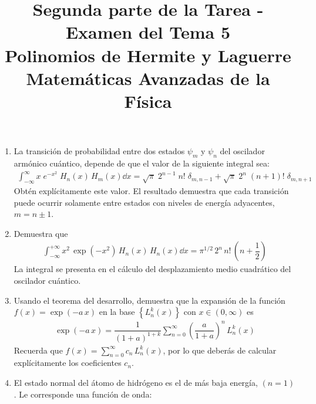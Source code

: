 
\author{}
\title{Segunda parte de la Tarea - Examen del Tema 5  \\ \large{Polinomios de Hermite y Laguerre \\ Matemáticas Avanzadas de la Física}} \vspace{-1.5\baselineskip}
\date{ }

\vspace{-4cm}
\renewcommand\labelenumii{\theenumi.{\arabic{enumii})}}
\maketitle
\fontsize{14}{14}\selectfont
\begin{enumerate}
\item La transición de probabilidad entre dos estados $\psi_{m}$ y $\psi_{n}$ del oscilador armónico cuántico, depende de que el valor de la siguiente integral sea:
\begin{align*}
\int_{-\infty}^{\infty} x \; e^{-x^{2}} \; H_{n} (x) \, H_{m}(x) \dd{x} = \sqrt{\pi} \; 2^{n-1} \; n! \; \delta_{m,n-1} + \sqrt{\pi} \; 2^{n} \; (n+1)! \; \delta_{m,n+1}
\end{align*}
Obtén explícitamente este valor. El resultado demuestra que cada transición puede ocurrir solamente entre estados con niveles de energía adyacentes, $m = n \pm 1$.
\item Demuestra que
\begin{align*}
\int_{-\infty}^{+\infty} x^{2} \, \exp \left( -x^{2} \right) \, H_{n} (x) \, H_{n} (x) \dd{x} = \pi^{1/2} \, 2^{n} \, n! \, \left( n + \dfrac{1}{2} \right)
\end{align*}
La integral se presenta en el cálculo del desplazamiento medio cuadrático del oscilador cuántico.
\item Usando el teorema del desarrollo, demuestra que la expansión de la función $f(x) = \exp(-a \, x)$ en la base $\left\{ L_{n}^{k} (x) \right\}$ con $ x \in (0, \infty)$ es
\begin{align*}
\exp(-a \, x) = \dfrac{1}{(1 + a)^{1+k}} \sum_{n=0}^{\infty} \left( \dfrac{a}{1 + a} \right)^{n} \, L_{n}^{k} (x)
\end{align*}
Recuerda que $\displaystyle f(x) = \sum_{n=0}^{\infty} c_{n} \, L_{n}^{k} (x)$, por lo que deberás de calcular explícitamente los coeficientes $c_{n}$.
\item El estado normal del átomo de hidrógeno es el de más baja energía, $(n = 1)$. Le corresponde una función de onda:

\end{enumerate}
